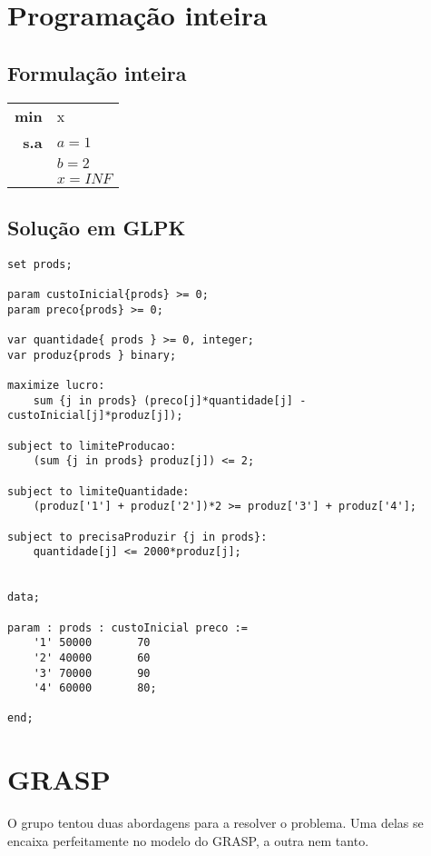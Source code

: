 \documentclass{report}
\begin{document}
\chapter{Programação inteira}

\section{Formulação inteira}

\begin{center}
\begin{tabular}{ r l }
  \textbf{min} & x \\
  \textbf{s.a} & $a = 1$ \\
  & $b = 2$ \\
  & $x = INF$ \\
\end{tabular}
\end{center}

\section{Solução em GLPK}

\begin{lstlisting}
set prods;

param custoInicial{prods} >= 0;
param preco{prods} >= 0;

var quantidade{ prods } >= 0, integer;
var produz{prods } binary;

maximize lucro:
	sum {j in prods} (preco[j]*quantidade[j] - custoInicial[j]*produz[j]);

subject to limiteProducao:
	(sum {j in prods} produz[j]) <= 2;

subject to limiteQuantidade:
	(produz['1'] + produz['2'])*2 >= produz['3'] + produz['4'];

subject to precisaProduzir {j in prods}:
	quantidade[j] <= 2000*produz[j];


data;

param : prods : custoInicial preco :=
	'1'	50000		70
	'2'	40000		60
	'3'	70000		90
	'4'	60000		80;

end;
\end{lstlisting}




\chapter{GRASP}

O grupo tentou duas abordagens para a resolver o problema. Uma delas se encaixa
perfeitamente no modelo do GRASP,  a outra nem tanto.
\end{document}

